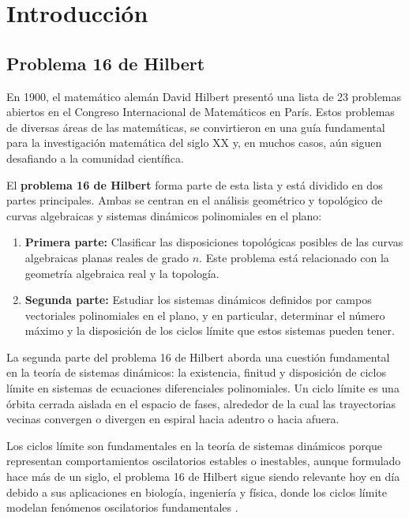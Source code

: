\chapter{Introducción}

\section{Problema 16 de Hilbert}
En 1900, el matemático alemán David Hilbert presentó una lista de 23 problemas abiertos en el Congreso Internacional de Matemáticos en París. Estos problemas de diversas áreas de las matemáticas, se convirtieron en una guía fundamental para la investigación matemática del siglo XX y, en muchos casos, aún siguen desafiando a la comunidad científica. \cite{hilbert1902mathematical}

El \textbf{problema 16 de Hilbert} forma parte de esta lista y está dividido en dos partes principales. Ambas se centran en el análisis geométrico y topológico de curvas algebraicas y sistemas dinámicos polinomiales en el plano:

\begin{enumerate}
	\item \textbf{Primera parte:} Clasificar las disposiciones topológicas posibles de las curvas algebraicas planas reales de grado $n$. Este problema está relacionado con la geometría algebraica real y la topología.
	\item \textbf{Segunda parte:} Estudiar los sistemas dinámicos definidos por campos vectoriales polinomiales en el plano, y en particular, determinar el número máximo y la disposición de los ciclos límite que estos sistemas pueden tener.
\end{enumerate}

La segunda parte del problema 16 de Hilbert aborda una cuestión fundamental en la teoría de sistemas dinámicos: la existencia, finitud y disposición de ciclos límite en sistemas de ecuaciones diferenciales polinomiales. Un ciclo límite es una órbita cerrada aislada en el espacio de fases, alrededor de la cual las trayectorias vecinas convergen o divergen en espiral hacia adentro o hacia afuera. 

Los ciclos límite son fundamentales en la teoría de sistemas dinámicos porque representan comportamientos oscilatorios estables o inestables, aunque formulado hace más de un siglo, el problema 16 de Hilbert sigue siendo relevante hoy en día debido a sus aplicaciones en biología, ingeniería y física, donde los ciclos límite modelan fenómenos oscilatorios fundamentales \cite{ilyashenko2002centennial}.

